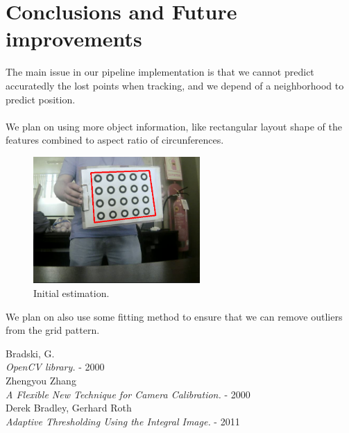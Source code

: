 \documentclass[journal]{IEEEtran}
\begin{document}
\section{Conclusions and Future improvements}
The main issue in our pipeline implementation is that we cannot predict accuratedly the lost points when tracking, and we depend of a neighborhood to predict position.
\\
\\
We plan on using more object information, like rectangular layout shape of the features combined to aspect ratio of circunferences.
\\
\begin{figure}[H]
\centering
\includegraphics[width=2.5in]{_img/img_results_fut_1.png}
\caption{Initial estimation.}
\end{figure}
%
We plan on also use some fitting method to ensure that we can remove outliers from the grid pattern.


\begin{thebibliography}{1}

  Bradski, G. \\
  \textit{OpenCV library.} - 2000
\\
  Zhengyou Zhang \\
  \textit{A Flexible New Technique for Camera Calibration.} - 2000
\\
  Derek Bradley, Gerhard Roth \\
  \textit{Adaptive Thresholding Using the Integral Image.} - 2011


\end{thebibliography}
\end{document}
